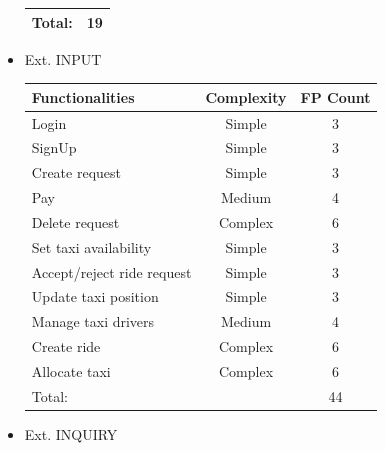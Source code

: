 \documentclass[a4paper,11pt]{report} %
\begin{document}
\begin{itemize}
\begin{center}
\begin{tabular}{| p{7cm} | p{2.5cm} | p{2cm} |}
						\multicolumn{2}{|l|}{Total:} & \multicolumn{1}{|c|}{19}\\\hline	
					\end{tabular}
				\end{center}
				\item Ext. INPUT
				\renewcommand{\arraystretch}{1.2}
				\setlength{\tabcolsep}{12pt}
				\begin{center}
					\begin{tabular}{| p{7cm} | p{2.5cm} | p{2cm} |}\hline
						\textbf{Functionalities} & \multicolumn{1}{|c|}{\textbf{Complexity}} & \textbf{FP Count}\\\hline
						Login & \multicolumn{1}{|c|}{Simple} & \multicolumn{1}{|c|}{3}\\\hline
						SignUp & \multicolumn{1}{|c|}{Simple} & \multicolumn{1}{|c|}{3}\\\hline
						Create request & \multicolumn{1}{|c|}{Simple} & \multicolumn{1}{|c|}{3}\\\hline					
						Pay & \multicolumn{1}{|c|}{Medium} & \multicolumn{1}{|c|}{4}\\\hline		
						Delete request & \multicolumn{1}{|c|}{Complex} & \multicolumn{1}{|c|}{6}\\\hline	
						Set taxi availability & \multicolumn{1}{|c|}{Simple} & \multicolumn{1}{|c|}{3}\\\hline					
						Accept/reject ride request & \multicolumn{1}{|c|}{Simple} & \multicolumn{1}{|c|}{3}\\\hline			
						Update taxi position & \multicolumn{1}{|c|}{Simple} & \multicolumn{1}{|c|}{3}\\\hline				
						Manage taxi drivers & \multicolumn{1}{|c|}{Medium} & \multicolumn{1}{|c|}{4}\\\hline				
						Create ride & \multicolumn{1}{|c|}{Complex} & \multicolumn{1}{|c|}{6}\\\hline		
						Allocate taxi & \multicolumn{1}{|c|}{Complex} & \multicolumn{1}{|c|}{6}\\\hline																																																												
						\multicolumn{2}{|l|}{Total:} & \multicolumn{1}{|c|}{44}\\\hline
					\end{tabular}
				\end{center}
				\item Ext. INQUIRY
				\renewcommand{\arraystretch}{1.2}
				\setlength{\tabcolsep}{12pt}
				\begin{center}
					\begin{tabular}{| p{7cm} | p{2.5cm} | p{2cm} |}\hline

\end{tabular}
\end{center}
\end{itemize}
\end{document}
